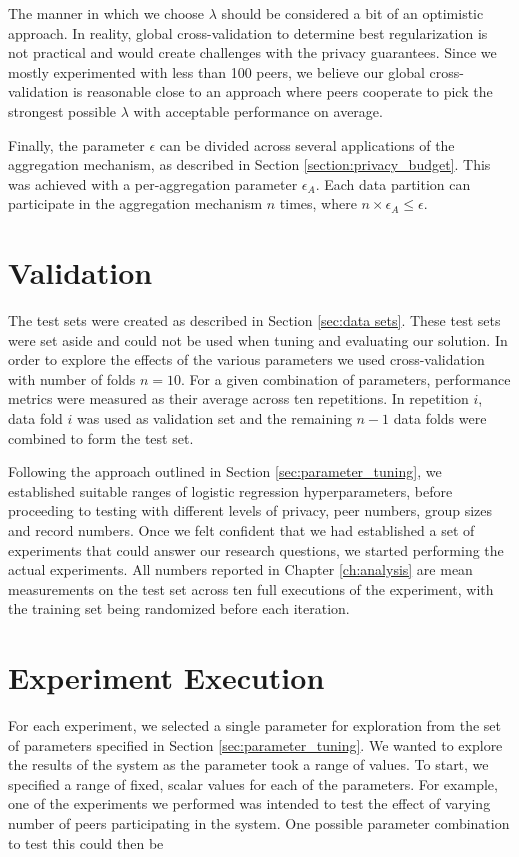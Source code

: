 The manner in which we choose $\lambda$ should be considered a bit of an optimistic approach. In reality, global cross-validation to determine best regularization is not practical and would create challenges with the privacy guarantees. Since we mostly experimented with less than 100 peers, we believe our global cross-validation is reasonable close to an approach where peers cooperate to pick the strongest possible $\lambda$ with acceptable performance on average.

Finally, the parameter $\epsilon$ can be divided across several applications of the aggregation mechanism, as described in Section \ref{section:privacy_budget}. This was achieved with a per-aggregation parameter $\epsilon_A$. Each data partition can participate in the aggregation mechanism $n$ times, where $n \times \epsilon_A \leq \epsilon$.

\section{Validation}

The test sets were created as described in Section \ref{sec:data sets}. These test sets were set aside and could not be used when tuning and evaluating our solution. In order to explore the effects of the various parameters we used cross-validation with number of folds $n=10$. For a given combination of parameters, performance metrics were measured as their average across ten repetitions. In repetition $i$, data fold $i$ was used as validation set and the remaining $n-1$ data folds were combined to form the test set.

Following the approach outlined in Section \ref{sec:parameter_tuning}, we established suitable ranges of logistic regression hyperparameters, before proceeding to testing with different levels of privacy, peer numbers, group sizes and record numbers. Once we felt confident that we had established a set of experiments that could answer our research questions, we started performing the actual experiments. All numbers reported in Chapter \ref{ch:analysis} are mean measurements on the test set across ten full executions of the experiment, with the training set being randomized before each iteration.

\section{Experiment Execution}

For each experiment, we selected a single parameter for exploration from the set of parameters specified in Section \ref{sec:parameter_tuning}. We wanted to explore the results of the system as the parameter took a range of values. To start, we specified a range of fixed, scalar values for each of the parameters. For example, one of the experiments we performed was intended to test the effect of varying number of peers participating in the system. One possible parameter combination to test this could then be


